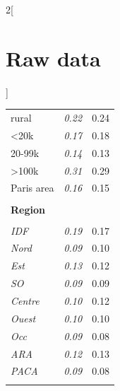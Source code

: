 \documentclass[12pt]{article} %
\begin{document}
\begin{appendices}
\begin{multicols}{2}[\section{Raw data\label{sec:Raw-Data}}]
\begin{minipage}[t]{.45\textwidth}
\begin{table}[H]
\begin{tabular}{lcc}
rural & \emph{0.22} & 0.24\tabularnewline
<20k & \emph{0.17} & 0.18\tabularnewline
20-99k & \emph{0.14} & 0.13\tabularnewline
>100k & \emph{0.31} & 0.29\tabularnewline
Paris area & \emph{0.16} & 0.15\tabularnewline
\hline  \\[-1.8ex]
\textbf{Region} &  & \tabularnewline  \\[-1.8ex]
\emph{IDF} & \emph{0.19} & 0.17\tabularnewline
 \emph{Nord} & \emph{0.09} & 0.10\tabularnewline
 \emph{Est} & \emph{0.13} & 0.12\tabularnewline
\emph{SO} & \emph{0.09} & 0.09\tabularnewline
\emph{Centre} & \emph{0.10} & 0.12\tabularnewline
 \emph{Ouest} & \emph{0.10} & 0.10\tabularnewline
 \emph{Occ} & \emph{0.09} & 0.08\tabularnewline
\emph{ARA} & \emph{0.12} & 0.13\tabularnewline
\emph{PACA} & \emph{0.09} & 0.08\tabularnewline  \\[-1.8ex]
\hline \hline 
\end{tabular}\bigskip{}
\end{table}
\end{minipage}


\end{multicols}
\end{appendices}
\end{document}

